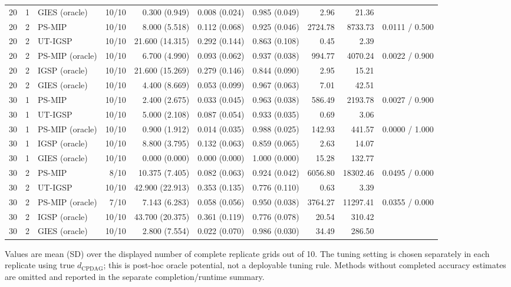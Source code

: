 \begin{tabular}{@{}rrlrrrrrrr@{}}
20 & 1 & GIES (oracle) & 10/10 & 0.300 (0.949) & 0.008 (0.024) & 0.985 (0.049) & 2.96 & 21.36 &  \\
20 & 2 & PS-MIP & 10/10 & 8.000 (5.518) & 0.112 (0.068) & 0.925 (0.046) & 2724.78 & 8733.73 & 0.0111 / 0.500 \\
20 & 2 & UT-IGSP & 10/10 & 21.600 (14.315) & 0.292 (0.144) & 0.863 (0.108) & 0.45 & 2.39 &  \\
20 & 2 & PS-MIP (oracle) & 10/10 & 6.700 (4.990) & 0.093 (0.062) & 0.937 (0.038) & 994.77 & 4070.24 & 0.0022 / 0.900 \\
20 & 2 & IGSP (oracle) & 10/10 & 21.600 (15.269) & 0.279 (0.146) & 0.844 (0.090) & 2.95 & 15.21 &  \\
20 & 2 & GIES (oracle) & 10/10 & 4.400 (8.669) & 0.053 (0.099) & 0.967 (0.063) & 7.01 & 42.51 &  \\
30 & 1 & PS-MIP & 10/10 & 2.400 (2.675) & 0.033 (0.045) & 0.963 (0.038) & 586.49 & 2193.78 & 0.0027 / 0.900 \\
30 & 1 & UT-IGSP & 10/10 & 5.000 (2.108) & 0.087 (0.054) & 0.933 (0.035) & 0.69 & 3.06 &  \\
30 & 1 & PS-MIP (oracle) & 10/10 & 0.900 (1.912) & 0.014 (0.035) & 0.988 (0.025) & 142.93 & 441.57 & 0.0000 / 1.000 \\
30 & 1 & IGSP (oracle) & 10/10 & 8.800 (3.795) & 0.132 (0.063) & 0.859 (0.065) & 2.63 & 14.07 &  \\
30 & 1 & GIES (oracle) & 10/10 & 0.000 (0.000) & 0.000 (0.000) & 1.000 (0.000) & 15.28 & 132.77 &  \\
30 & 2 & PS-MIP & 8/10 & 10.375 (7.405) & 0.082 (0.063) & 0.924 (0.042) & 6056.80 & 18302.46 & 0.0495 / 0.000 \\
30 & 2 & UT-IGSP & 10/10 & 42.900 (22.913) & 0.353 (0.135) & 0.776 (0.110) & 0.63 & 3.39 &  \\
30 & 2 & PS-MIP (oracle) & 7/10 & 7.143 (6.283) & 0.058 (0.056) & 0.950 (0.038) & 3764.27 & 11297.41 & 0.0355 / 0.000 \\
30 & 2 & IGSP (oracle) & 10/10 & 43.700 (20.375) & 0.361 (0.119) & 0.776 (0.078) & 20.54 & 310.42 &  \\
30 & 2 & GIES (oracle) & 10/10 & 2.800 (7.554) & 0.022 (0.070) & 0.986 (0.030) & 34.49 & 286.50 &  \\
\hline
\end{tabular}
\par\smallskip\footnotesize Values are mean (SD) over the displayed number of complete replicate grids out of 10. The tuning setting is chosen separately in each replicate using true $d_{\mathrm{CPDAG}}$; this is post-hoc oracle potential, not a deployable tuning rule. Methods without completed accuracy estimates are omitted and reported in the separate completion/runtime summary.
\endgroup
